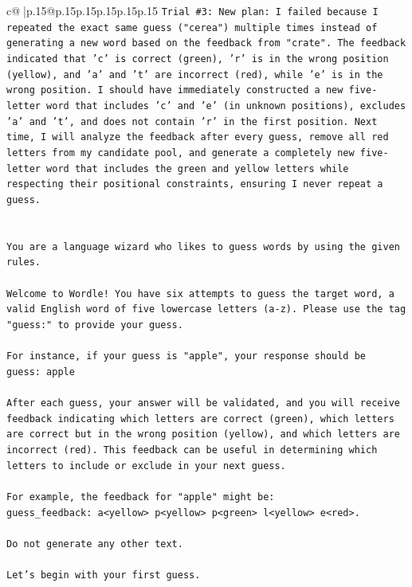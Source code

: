 \documentclass{article}
\begin{document}
{\begin{supertabular}{c@{$\;$}|p{.15\linewidth}@{}p{.15\linewidth}p{.15\linewidth}p{.15\linewidth}p{.15\linewidth}p{.15\linewidth}}
{{{\texttt{Trial \#3: New plan: I failed because I repeated the exact same guess ("cerea") multiple times instead of generating a new word based on the feedback from "crate". The feedback indicated that 'c' is correct (green), 'r' is in the wrong position (yellow), and 'a' and 't' are incorrect (red), while 'e' is in the wrong position. I should have immediately constructed a new five{-}letter word that includes 'c' and 'e' (in unknown positions), excludes 'a' and 't', and does not contain 'r' in the first position. Next time, I will analyze the feedback after every guess, remove all red letters from my candidate pool, and generate a completely new five{-}letter word that includes the green and yellow letters while respecting their positional constraints, ensuring I never repeat a guess.} \\
\\ 
\\ 
\texttt{You are a language wizard who likes to guess words by using the given rules.} \\
\\ 
\texttt{Welcome to Wordle! You have six attempts to guess the target word, a valid English word of five lowercase letters (a{-}z). Please use the tag "guess:" to provide your guess.} \\
\\ 
\texttt{For instance, if your guess is "apple", your response should be} \\
\texttt{guess: apple} \\
\\ 
\texttt{After each guess, your answer will be validated, and you will receive feedback indicating which letters are correct (green), which letters are correct but in the wrong position (yellow), and which letters are incorrect (red). This feedback can be useful in determining which letters to include or exclude in your next guess.} \\
\\ 
\texttt{For example, the feedback for "apple" might be:} \\
\texttt{guess\_feedback: a<yellow> p<yellow> p<green> l<yellow> e<red>.} \\
\\ 
\texttt{Do not generate any other text.} \\
\\ 
\texttt{Let's begin with your first guess.} \\
            }
        }
    }
     \\ \\


\end{supertabular}}
\end{document}
